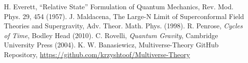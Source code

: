 \documentclass[aps,prd,twocolumn,nofootinbib,superscriptaddress]{revtex4-2}
\begin{document}

\begin{thebibliography}{9}
H. Everett, ``Relative State'' Formulation of Quantum Mechanics, Rev. Mod. Phys. 29, 454 (1957).
J. Maldacena, The Large-N Limit of Superconformal Field Theories and Supergravity, Adv. Theor. Math. Phys. (1998).
R. Penrose, \textit{Cycles of Time}, Bodley Head (2010).
C. Rovelli, \textit{Quantum Gravity}, Cambridge University Press (2004).
K. W. Banasiewicz, Multiverse-Theory GitHub Repository, \url{https://github.com/krzyshtoof/Multiverse-Theory}
\end{thebibliography}
\end{document}
